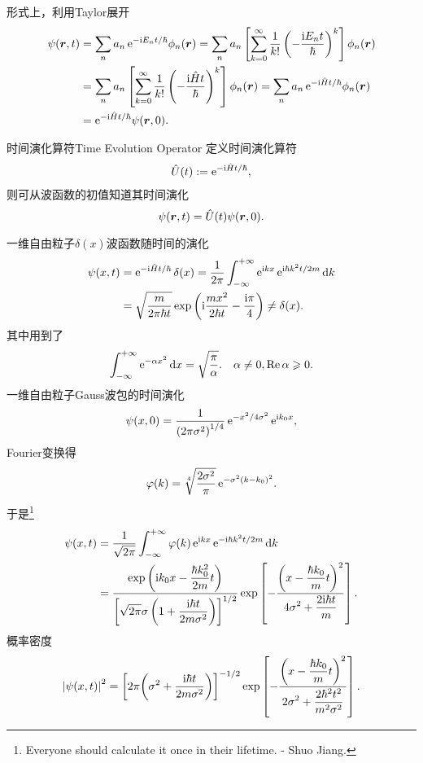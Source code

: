 形式上，利用Taylor展开
\begin{align*}
	\psi(\bm r,t) & =\sum_na_n\mathop{}\!\mathrm{e}^{-\mathrm{i} E_nt/\hbar}\phi_n(\bm r)=\sum_na_n\left[\sum_{k=0}^\infty\frac1{k!}\left(-\frac{\mathrm{i} E_nt}\hbar\right)^k\right]\phi_n(\bm r)     \\
	           & =\sum_na_n\left[\sum_{k=0}^\infty\frac1{k!}\left(-\frac{\mathrm{i}\hat Ht}\hbar\right)^k\right]\phi_n(\bm r)=\sum_na_n\mathop{}\!\mathrm{e}^{-\mathrm{i}\hat Ht/\hbar}\phi_n(\bm r) \\
	           & =\mathop{}\!\mathrm{e}^{-\mathrm{i}\hat Ht/\hbar}\psi(\bm r,0).
\end{align*}
\begin{definition}{时间演化算符}{Time Evolution Operator}
	定义时间演化算符
	\begin{align}
		\hat U(t):=\mathop{}\!\mathrm{e}^{-\mathrm{i}\hat Ht/\hbar},
	\end{align}
	则可从波函数的初值知道其时间演化
	\[
		\psi(\bm r,t)=\hat U(t)\psi(\bm r,0).
\]
\end{definition}
\eg[1] 一维自由粒子$\delta(x)$波函数随时间的演化
\begin{align*}
	\psi(x,t) & =\mathop{}\!\mathrm{e}^{-\mathrm{i}\hat Ht/\hbar}\mathop{}\!\delta(x)=\frac1{2\pi}\int_{-\infty}^{+\infty}\mathop{}\!\mathrm{e}^{\mathrm{i} kx}\mathop{}\!\mathrm{e}^{\mathrm{i}\hbar k^2t/2m}\mathop{}\!\mathrm{d} k      \\
	          & =\sqrt{\frac m{2\pi\hbar t}}\exp\left(\mathrm{i}\frac{mx^2}{2\hbar t}-\frac{\mathrm{i}\pi}4\right)\neq\mathop{}\!\delta(x).
\end{align*}
其中用到了
\begin{align}
	\int_{-\infty}^{+\infty}\mathop{}\!\mathrm{e}^{-\alpha x^2}\mathop{}\!\mathrm{d} x=\sqrt{\frac\pi\alpha}.\quad\alpha\neq 0,\operatorname{Re}\alpha\geqslant 0.
\end{align}
\eg[2]一维自由粒子Gauss波包的时间演化
\[
	\psi(x,0)=\frac1{\left(2\pi\sigma^2\right)^{1/4}}\mathop{}\!\mathrm{e}^{-x^2/4\sigma^2}\mathop{}\!\mathrm{e}^{\mathrm{i} k_0x},
\]
Fourier变换得
\[
	\varphi(k)=\sqrt[4]{\frac{2\sigma^2}{\pi}}\mathop{}\!\mathrm{e}^{-\sigma^2(k-k_0)^2}.
\]%
于是\footnote{Everyone should calculate it once in their lifetime. - Shuo Jiang.}
\begin{align*}
	\psi(x,t) & =\frac1{\sqrt{2\pi}}\int_{-\infty}^{+\infty}\varphi(k)\mathop{}\!\mathrm{e}^{\mathrm{i} kx}\mathop{}\!\mathrm{e}^{-\mathrm{i}\hbar k^2t/2m}\mathop{}\!\mathrm{d} k                                                                                                                            \\
	          & =\frac{\displaystyle \exp\left(\mathrm{i} k_0x-\frac{\hbar k_0^2}{2m}t\right)}{\displaystyle \left[\sqrt{2\pi}\sigma\left(1+\frac{\mathrm{i}\hbar t}{2m\sigma^2}\right)\right]^{1/2}}\exp\left[-\frac{\displaystyle \left(x-\frac{\hbar k_0}mt\right)^2}{\displaystyle 4\sigma^2+\frac{2\mathrm{i}\hbar t}m}\right].
\end{align*}
概率密度
\begin{align*}
	\left\lvert\psi(x,t)\right\rvert^2=\left[2\pi\!\left(\sigma^2+\frac{\mathrm{i}\hbar t}{2m\sigma^2}\right)\right]^{-1/2}\exp\left[-\frac{\displaystyle \left(x-\frac{\hbar k_0}mt\right)^2}{\displaystyle 2\sigma^2+\frac{2\hbar^2 t^2}{m^2\sigma^2}}\right].
\end{align*}


